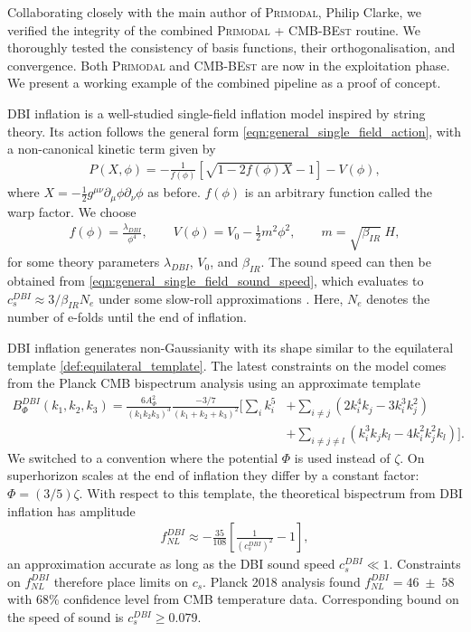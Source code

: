 Collaborating closely with the main author of \textsc{Primodal}, Philip Clarke, we verified the integrity of the combined \textsc{Primodal} + \textsc{CMB-BEst} routine. We thoroughly tested the consistency of basis functions, their orthogonalisation, and convergence. Both \textsc{Primodal} and \textsc{CMB-BEst} are now in the exploitation phase. We present a working example of the combined pipeline as a proof of concept.

DBI inflation \cite{Silverstein2004dbi,Alishahiha2004dbi,Chen2005runningdbi,Bean2008comparingdbi} is a well-studied single-field inflation model inspired by string theory. Its action follows the general form \eqref{eqn:general_single_field_action}, with a non-canonical kinetic term given by
\begin{align}
	P(X,\phi) = - \frac{1}{f(\phi)} \left[ \sqrt{1 - 2f(\phi)X} - 1 \right] - V(\phi),
\end{align}
where $X=-\frac{1}{2} g^{\mu\nu} \partial_\mu \phi \partial_\nu \phi$ as before. $f(\phi)$ is an arbitrary function called the warp factor. We choose
\begin{align}
	f(\phi) = \frac{\lambda_{DBI}}{\phi^4}, \qquad V(\phi) = V_0 - \frac{1}{2}m^2\phi^2, \qquad m = \sqrt{\beta_{IR}} \; H,
\end{align}
for some theory parameters $\lambda_{DBI}$, $V_0$, and $\beta_{IR}$. The sound speed can then be obtained from \eqref{eqn:general_single_field_sound_speed}, which evaluates to $c^{DBI}_s \approx 3/\beta_{IR} N_e$ under some slow-roll approximations \cite{Chen2005runningdbi}. Here, $N_e$ denotes the number of e-folds until the end of inflation.

DBI inflation generates non-Gaussianity with its shape similar to the equilateral template \eqref{def:equilateral_template}. The latest constraints on the model comes from the Planck CMB bispectrum analysis using an approximate template 
\begin{align}
	B_\Phi^{DBI}(k_1,k_2,k_3) = \frac{6A_\Phi^2}{(k_1 k_2 k_3)^3} \frac{-3/7}{(k_1 + k_2 + k_3)^2} \bigg[ \sum_i k_i^5 &+ \sum_{i\neq j} (2k_i^4 k_j - 3k_i^3 k_j^2)  \nonumber \\
	&+ \sum_{i\neq j\neq l} (k_i^3 k_j k_l - 4k_i^2 k_j^2 k_l) \bigg]. \label{eqn:dbi_bispectrum_template}
\end{align}
We switched to a convention where the potential $\Phi$ is used instead of $\zeta$. On superhorizon scales at the end of inflation they differ by a constant factor: $\Phi = (3/5)\zeta$. With respect to this template, the theoretical bispectrum from DBI inflation has amplitude
\begin{align}
	f_{NL}^{DBI} \approx - \frac{35}{108} \left[ \frac{1}{\left( c^{DBI}_s \right)^2} - 1 \right], \label{eqn:DBI_fNL_and_sound_speed}
\end{align}
an approximation accurate as long as the DBI sound speed $c^{DBI}_s \ll 1$. Constraints on $f_{NL}^{DBI}$ therefore place limits on $c_s$. Planck 2018 analysis \cite{PlanckCollaboration2018} found $f_{NL}^{DBI} = 46 \;\pm\; 58$ with 68\% confidence level from CMB temperature data. Corresponding bound on the speed of sound is $c^{DBI}_s \ge 0.079$.

